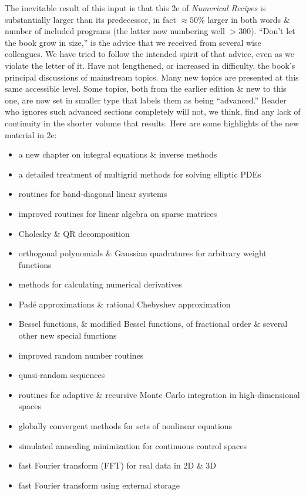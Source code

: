 \documentclass{article}
\begin{document}
\begin{enumerate}
	The inevitable result of this input is that this 2e of {\it Numerical Recipes} is substantially larger than its predecessor, in fact $\approx50\%$ larger in both words \& number of included programs (the latter now numbering well $> 300$). ``Don't let the book grow in size,'' is the advice that we received from several wise colleagues. We have tried to follow the intended spirit of that advice, even as we violate the letter of it. Have not lengthened, or increased in difficulty, the book's principal discussions of mainstream topics. Many new topics are presented at this same accessible level. Some topics, both from the earlier edition \& new to this one, are now set in smaller type that labels them as being ``advanced.'' Reader who ignores such advanced sections completely will not, we think, find any lack of continuity in the shorter volume that results. Here are some highlights of the new material in 2e:
	\begin{itemize}
		\item a new chapter on integral equations \& inverse methods
		\item a detailed treatment of multigrid methods for solving elliptic PDEs
		\item routines for band-diagonal linear systems
		\item improved routines for linear algebra on sparse matrices
		\item Cholesky \& QR decomposition
		\item orthogonal polynomials \& Gaussian quadratures for arbitrary weight functions
		\item methods for calculating numerical derivatives
		\item Pad\'e approximations \& rational Chebyshev approximation
		\item Bessel functions, \& modified Bessel functions, of fractional order \& several other new special functions
		\item improved random number routines
		\item quasi-random sequences
		\item routines for adaptive \& recursive Monte Carlo integration in high-dimensional spaces
		\item globally convergent methods for sets of nonlinear equations
		\item simulated annealing minimization for continuous control spaces
		\item fast Fourier transform (FFT) for real data in 2D \& 3D
		\item fast Fourier transform using external storage

\end{itemize}
\end{enumerate}
\end{document}
